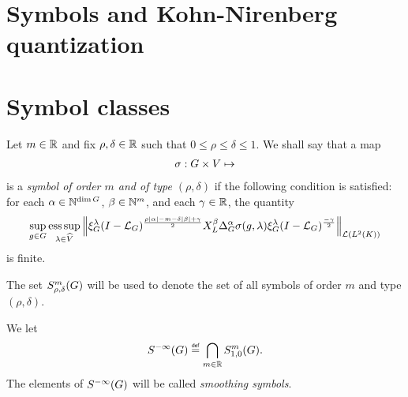 \section{Symbols and Kohn-Nirenberg quantization}

\section{Symbol classes}

\begin{definition}
\label{definition:symbol_classes}
    Let $m \in \R$ and fix $\rho, \delta \in \R$ such that $0 \leq \rho \leq \delta \leq 1$.
    We shall say that a map
    \begin{align*}
        \sigma : \Group \times \VectorSpace \mapsto
    \end{align*}
    is a \emph{symbol of order $m$ and of type $(\rho, \delta)$} if the following condition is satisfied:
    for each $\alpha \in \N^{\dim \Group}$, $\beta \in \N^m$, and each $\gamma \in \R$, the quantity
    \begin{align*}
        \sup_{g \in \Group} \esssup_{\lambda \in \dualGroup\VectorSpace}
        \norm[\Lin{\Lebesgue{2}{\CompactGroup}}]{\Rep{\lambda} \BesselPotential{\rho \abs\alpha - m - \delta \abs\beta + \gamma} \LeftDifferentialOperator{\beta} \DifferenceOperatorOrder{\alpha} \sigma(g, \lambda) \Rep{\lambda} \BesselPotential{-\gamma}}
    \end{align*}
    is finite.

    The set $\SymbolClass{m}{\rho, \delta}$ will be used to denote the set of all symbols of order $m$ and type $(\rho, \delta)$.
\end{definition}

\begin{definition}
\label{definition:smoothing_symbols}
    We let
    \begin{align*}
        \SmoothingSymbols \defeq \bigcap_{m \in \R} \SymbolClass{m}{1, 0}.
    \end{align*}
    The elements of $\SmoothingSymbols$ will be called \emph{smoothing symbols}.
\end{definition}

